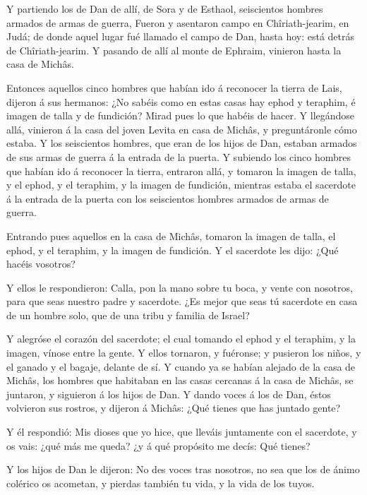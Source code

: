  Y partiendo los de Dan de allí, de Sora y de Esthaol,
seiscientos hombres armados de armas de guerra,  Fueron y
asentaron campo en Chîriath-jearim, en Judá; de donde aquel lugar fué
llamado el campo de Dan, hasta hoy: está detrás de Chîriath-jearim.
 Y pasando de allí al monte de Ephraim, vinieron hasta la
casa de Michâs.

 Entonces aquellos cinco hombres que habían ido á reconocer
la tierra de Lais, dijeron á sus hermanos: ¿No sabéis como en estas
casas hay ephod y teraphim, é imagen de talla y de fundición? Mirad pues
lo que habéis de hacer.  Y llegándose allá, vinieron á la
casa del joven Levita en casa de Michâs, y preguntáronle cómo estaba.
 Y los seiscientos hombres, que eran de los hijos de Dan,
estaban armados de sus armas de guerra á la entrada de la puerta.
 Y subiendo los cinco hombres que habían ido á reconocer la
tierra, entraron allá, y tomaron la imagen de talla, y el ephod, y el
teraphim, y la imagen de fundición, mientras estaba el sacerdote á la
entrada de la puerta con los seiscientos hombres armados de armas de
guerra.

 Entrando pues aquellos en la casa de Michâs, tomaron la
imagen de talla, el ephod, y el teraphim, y la imagen de fundición. Y el
sacerdote les dijo: ¿Qué hacéis vosotros?

 Y ellos le respondieron: Calla, pon la mano sobre tu boca,
y vente con nosotros, para que seas nuestro padre y sacerdote. ¿Es mejor
que seas tú sacerdote en casa de un hombre solo, que de una tribu y
familia de Israel?

 Y alegróse el corazón del sacerdote; el cual tomando el
ephod y el teraphim, y la imagen, vínose entre la gente.  Y
ellos tornaron, y fuéronse; y pusieron los niños, y el ganado y el
bagaje, delante de sí.  Y cuando ya se habían alejado de la
casa de Michâs, los hombres que habitaban en las casas cercanas á la
casa de Michâs, se juntaron, y siguieron á los hijos de Dan.
 Y dando voces á los de Dan, éstos volvieron sus rostros, y
dijeron á Michâs: ¿Qué tienes que has juntado gente?

 Y él respondió: Mis dioses que yo hice, que lleváis
juntamente con el sacerdote, y os vais: ¿qué más me queda? ¿y á qué
propósito me decís: Qué tienes?

 Y los hijos de Dan le dijeron: No des voces tras nosotros,
no sea que los de ánimo colérico os acometan, y pierdas también tu vida,
y la vida de los tuyos.

